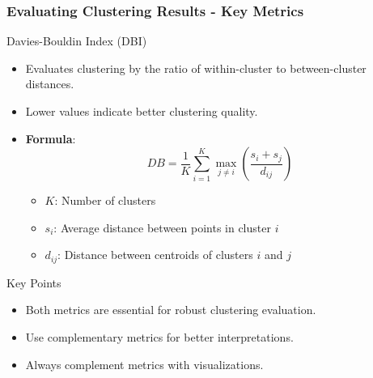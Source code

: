 \documentclass[aspectratio=169]{beamer}
\begin{document}
\begin{frame}[fragile]
    \frametitle{Evaluating Clustering Results - Key Metrics}
    \begin{block}{Davies-Bouldin Index (DBI)}
        \begin{itemize}
            \item Evaluates clustering by the ratio of within-cluster to between-cluster distances.
            \item Lower values indicate better clustering quality.
            \item \textbf{Formula}:
            \begin{equation}
                DB = \frac{1}{K} \sum_{i=1}^{K} \max_{j \neq i} \left( \frac{s_i + s_j}{d_{ij}} \right)
            \end{equation}
            \begin{itemize}
                \item \( K \): Number of clusters
                \item \( s_i \): Average distance between points in cluster \( i \)
                \item \( d_{ij} \): Distance between centroids of clusters \( i \) and \( j \)
            \end{itemize}
        \end{itemize}
    \end{block}
    
    \begin{block}{Key Points}
        \begin{itemize}
            \item Both metrics are essential for robust clustering evaluation.
            \item Use complementary metrics for better interpretations.
            \item Always complement metrics with visualizations.
        \end{itemize}
    \end{block}
\end{frame}
\end{document}
